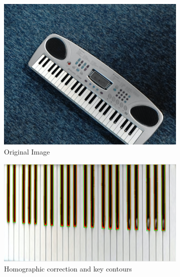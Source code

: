 \documentclass[12 pct]{report}
\begin{document}
\begin{figure}[H]
  \centering
  \begin{subfigure}[b]{0.4\linewidth}
    \includegraphics[width=\linewidth]{piano-originalv2}
     \caption{Original Image}
  \end{subfigure}
  \begin{subfigure}[b]{0.577\linewidth}
    \includegraphics[width=\linewidth]{piano-correctionv2}
    \caption{Homographic correction and key contours}
  \end{subfigure}
  \begin{subfigure}[b]{0.7\linewidth}

\end{subfigure}
\end{figure}
\end{document}

